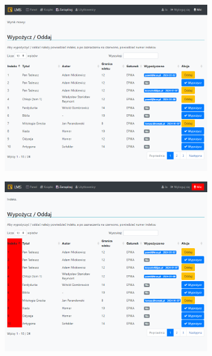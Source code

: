 \begin{figure}[H]
    \centering
    \begin{subfigure}[b]{0.4\textwidth}
        \includegraphics[width=\textwidth]{images/zaz}
        \label{fig:zaz}
    \end{subfigure}
    \hfill
    \begin{subfigure}[b]{0.4\textwidth}
        \includegraphics[width=\textwidth]{images/ind}
        \label{fig:zaz1}
    \end{subfigure}
    \label{fig:book-ooo}
\end{figure}

